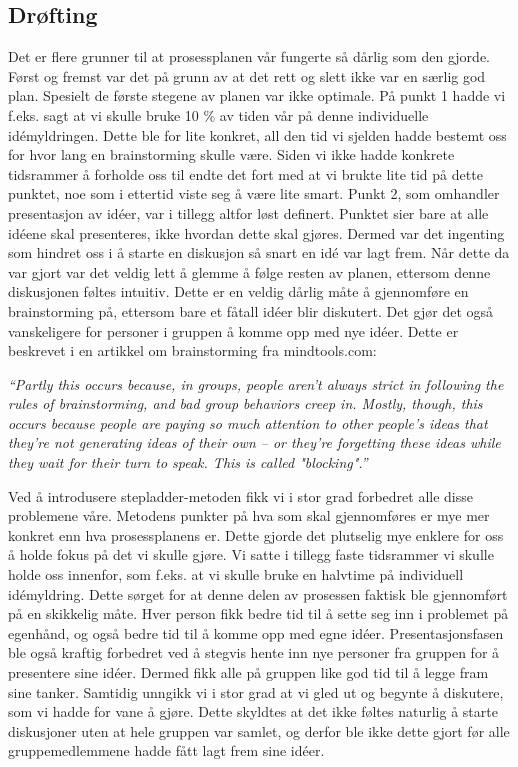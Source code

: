 \subsection{Drøfting}
Det er flere grunner til at prosessplanen vår fungerte så dårlig som den gjorde. Først og fremst var det på grunn av at det rett og slett ikke var en særlig god plan. Spesielt de første stegene av planen var ikke optimale. På punkt 1 hadde vi f.eks. sagt at vi skulle bruke 10 \% av tiden vår på denne individuelle idémyldringen. Dette ble for lite konkret, all den tid vi sjelden hadde bestemt oss for hvor lang en brainstorming skulle være. Siden vi ikke hadde konkrete tidsrammer å forholde oss til endte det fort med at vi brukte lite tid på dette punktet, noe som i ettertid viste seg å være lite smart. Punkt 2, som omhandler presentasjon av idéer, var i tillegg altfor løst definert. Punktet sier bare at alle idéene skal presenteres, ikke hvordan dette skal gjøres. Dermed var det ingenting som hindret oss i å starte en diskusjon så snart en idé var lagt frem. Når dette da var gjort var det veldig lett å glemme å følge resten av planen, ettersom denne diskusjonen føltes intuitiv. Dette er en veldig dårlig måte å gjennomføre en brainstorming på, ettersom bare et fåtall idéer blir diskutert. Det gjør det også vanskeligere for personer i gruppen å komme opp med nye idéer. Dette er beskrevet i en artikkel om brainstorming fra mindtools.com\cite{brainstorming}: \newline

\emph{“Partly this occurs because, in groups, people aren’t always strict in following the rules of brainstorming, and bad group behaviors creep in. Mostly, though, this occurs because people are paying so much attention to other people’s ideas that they're not generating ideas of their own – or they're forgetting these ideas while they wait for their turn to speak. This is called "blocking".”} \newline

Ved å introdusere stepladder-metoden fikk vi i stor grad forbedret alle disse problemene våre. Metodens punkter på hva som skal gjennomføres er mye mer konkret enn hva prosessplanens er. Dette gjorde det plutselig mye enklere for oss å holde fokus på det vi skulle gjøre. Vi satte i tillegg faste tidsrammer vi skulle holde oss innenfor, som f.eks. at vi skulle bruke en halvtime på individuell idémyldring. Dette sørget for at denne delen av prosessen faktisk ble gjennomført på en skikkelig måte. Hver person fikk bedre tid til å sette seg inn i problemet på egenhånd, og også bedre tid til å komme opp med egne idéer. Presentasjonsfasen ble også kraftig forbedret ved å stegvis hente inn nye personer fra gruppen for å presentere sine idéer. Dermed fikk alle på gruppen like god tid til å legge fram sine tanker. Samtidig unngikk vi i stor grad at vi gled ut og begynte å diskutere, som vi hadde for vane å gjøre. Dette skyldtes at det ikke føltes naturlig å starte diskusjoner uten at hele gruppen var samlet, og derfor ble ikke dette gjort før alle gruppemedlemmene hadde fått lagt frem sine idéer. 
